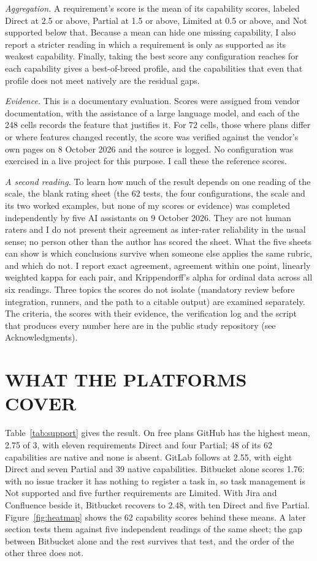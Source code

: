 \documentclass{IEEEcsmag}
\begin{document}
\emph{Aggregation.} A requirement's score is the mean of its capability scores, labeled Direct at 2.5 or above, Partial at 1.5 or above, Limited at 0.5 or above, and Not supported below that. Because a mean can hide one missing capability, I also report a stricter reading in which a requirement is only as supported as its weakest capability. Finally, taking the best score any configuration reaches for each capability gives a best-of-breed profile, and the capabilities that even that profile does not meet natively are the residual gaps.

\emph{Evidence.} This is a documentary evaluation. Scores were assigned from vendor documentation, with the assistance of a large language model, and each of the 248 cells records the feature that justifies it. For 72 cells, those where plans differ or where features changed recently, the score was verified against the vendor's own pages on 8 October 2026 and the source is logged. No configuration was exercised in a live project for this purpose. I call these the reference scores.

\emph{A second reading.} To learn how much of the result depends on one reading of the scale, the blank rating sheet (the 62 tests, the four configurations, the scale and its two worked examples, but none of my scores or evidence) was completed independently by five AI assistants on 9 October 2026. They are not human raters and I do not present their agreement as inter-rater reliability in the usual sense; no person other than the author has scored the sheet. What the five sheets can show is which conclusions survive when someone else applies the same rubric, and which do not. I report exact agreement, agreement within one point, linearly weighted kappa for each pair, and Krippendorff's alpha for ordinal data across all six readings. Three topics the scores do not isolate (mandatory review before integration, runners, and the path to a citable output) are examined separately. The criteria, the scores with their evidence, the verification log and the script that produces every number here are in the public study repository (see Acknowledgments).

\section{WHAT THE PLATFORMS COVER}

Table~\ref{tab:support} gives the result. On free plans GitHub has the highest mean, 2.75 of 3, with eleven requirements Direct and four Partial; 48 of its 62 capabilities are native and none is absent. GitLab follows at 2.55, with eight Direct and seven Partial and 39 native capabilities. Bitbucket alone scores 1.76: with no issue tracker it has nothing to register a task in, so task management is Not supported and five further requirements are Limited. With Jira and Confluence beside it, Bitbucket recovers to 2.48, with ten Direct and five Partial. Figure~\ref{fig:heatmap} shows the 62 capability scores behind these means. A later section tests them against five independent readings of the same sheet; the gap between Bitbucket alone and the rest survives that test, and the order of the other three does not.
\end{document}
